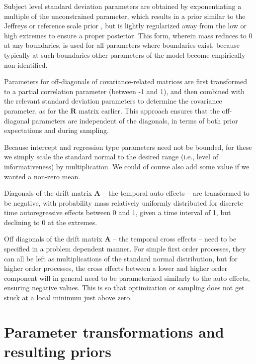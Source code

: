\documentclass[nojss]{jss}\usepackage[]{graphicx}\usepackage[]{color}
\newcommand{\vect}[1]{\boldsymbol{\mathbf{#1}}}
\begin{document}
Subject level standard deviation parameters are obtained by exponentiating a multiple of the unconstrained parameter, which results in a prior similar to the Jeffreys or reference scale prior \citep{bernardo1979Reference}, but is lightly regularized away from the low or high extremes to ensure a proper posterior. This form, wherein mass reduces to 0 at any boundaries, is used for all parameters where boundaries exist, because typically at such boundaries other parameters of the model become empirically non-identified. 

Parameters for off-diagonals of covariance-related matrices are first transformed to a partial correlation parameter (between -1 and 1), and then combined with the relevant standard deviation parameters to determine the covariance parameter, as for the $\vect{R}$ matrix earlier. This approach ensures that the off-diagonal parameters are independent of the diagonals, in terms of both prior expectations and during sampling. 

Because intercept and regression type parameters need not be bounded, for these we simply scale the standard normal to the desired range (i.e., level of informativeness) by multiplication. We could of course also add some value if we wanted a non-zero mean.

Diagonals of the drift matrix $\vect{A}$  -- the temporal auto effects -- are transformed to be negative, with probability mass relatively uniformly distributed for discrete time autoregressive effects between 0 and 1, given a time interval of 1, but declining to 0 at the extremes.

Off diagonals of the drift matrix $\vect{A}$ -- the temporal cross effects -- need to be specified in a problem dependent manner. For simple first order processes, they can all be left as multiplications of the standard normal distribution, but for higher order processes, the cross effects between a lower and higher order component will in general need to be parameterized similarly to the auto effects, ensuring negative values. This is so that optimization or sampling does not get stuck at a local minimum just above zero.

\section{Parameter transformations and resulting priors}
\label{app:transforms}
\end{document}
